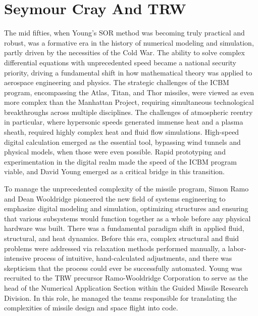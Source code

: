 \section{Seymour Cray And TRW}

The mid fifties, when Young’s SOR method was becoming truly practical and robust, was a formative era in the history of numerical modeling and simulation, partly driven by the necessities of the Cold War. The ability to solve complex differential equations with unprecedented speed became a national security priority, driving a fundamental shift in how mathematical theory was applied to aerospace engineering and physics. The strategic challenges of the ICBM program, encompassing the Atlas, Titan, and Thor missiles, were viewed as even more complex than the Manhattan Project, requiring simultaneous technological breakthroughs across multiple disciplines. The challenges of atmospheric reentry in particular, where hypersonic speeds generated immense heat and a plasma sheath, required highly complex heat and fluid flow simulations. High-speed digital calculation emerged as the essential tool, bypassing wind tunnels and physical models, when those were even possible. Rapid prototyping and experimentation in the digital realm made the speed of the ICBM program viable, and David Young emerged as a critical bridge in this transition. 

To manage the unprecedented complexity of the missile program, Simon Ramo and Dean Wooldridge pioneered the new field of systems engineering to emphasize digital modeling and simulation, optimizing structures and ensuring that various subsystems would function together as a whole before any physical hardware was built. There was a fundamental paradigm shift in applied fluid, structural, and heat dynamics. Before this era, complex structural and fluid problems were addressed via relaxation methods performed manually, a labor-intensive process of intuitive, hand-calculated adjustments, and there was skepticism that the process could ever be successfully automated. Young was recruited to the TRW precursor Ramo-Wooldridge Corporation to serve as the head of the Numerical Application Section within the Guided Missile Research Division. In this role, he managed the teams responsible for translating the complexities of missile design and space flight into code. 

